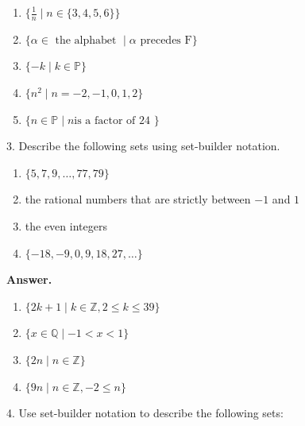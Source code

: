 \documentclass[10pt,]{book}
\theoremstyle{plain}
\theoremstyle{definition}
\theoremstyle{definition}
\theoremstyle{definition}
\theoremstyle{definition}
\begin{document}
\begin{exercisegroup}
\begin{enumerate}[label=\alph*]
\item\hypertarget{li-25}{} \(\{\frac{1}{n} \mid n \in \{3,4,5,6\}\}\)%
\item\hypertarget{li-26}{}  \(\{\alpha \in  \textrm{ the alphabet } \mid  \alpha \textrm{ precedes F}\}\)%
\item\hypertarget{li-27}{} \(\{-k \mid k \in \mathbb{P}\}\)%
\item\hypertarget{li-28}{} \(\{n^2 \mid  n = -2, -1, 0, 1, 2\}\)%
\item\hypertarget{li-29}{} \(\{n \in  \mathbb{P} \mid n \textrm{is a  factor of  24 }\}\)%
\end{enumerate}
%
\par\smallskip
\item[3.]\hypertarget{exercise-3}{}  Describe the following sets using set-builder notation. %
\par
\leavevmode%
\begin{multicols}{1}
\begin{enumerate}[label=\alph*]
\item\hypertarget{li-30}{} \(\{ 5, 7, 9, \dots , 77, 79\}\) %
\item\hypertarget{li-31}{}the rational numbers that are strictly between \(-1\) and \(1\) %
\item\hypertarget{li-32}{} the even integers%
\item\hypertarget{li-33}{} \(\{-18, -9,0,9, 18,27, \dots \}\) %
\end{enumerate}
\end{multicols}
%
\par\smallskip
\par\smallskip
\noindent\textbf{Answer.}\hypertarget{answer-2}{}\quad
\leavevmode%
\begin{enumerate}[label=\alph*]
\item\hypertarget{li-34}{} \(\{2k + 1 \mid k \in  \mathbb{Z}, 2 \leqslant  k \leqslant  39\}\) %
\item\hypertarget{li-35}{} \(\{x \in \mathbb{Q}\mid  -1 < x < 1\}\)%
\item\hypertarget{li-36}{} \(\{2n\mid n \in  \mathbb{Z}\}\) %
\item\hypertarget{li-37}{} \(\{9n\mid n \in \mathbb{Z}, -2 \leq  n\}\)%
\end{enumerate}
%
\item[4.]\hypertarget{exercise-4}{}  Use set-builder notation to describe the following sets: %
\par
\leavevmode%
\begin{multicols}{1}
\begin{enumerate}[label=\alph*]

\end{enumerate}
\end{multicols}
\end{exercisegroup}
\end{document}
